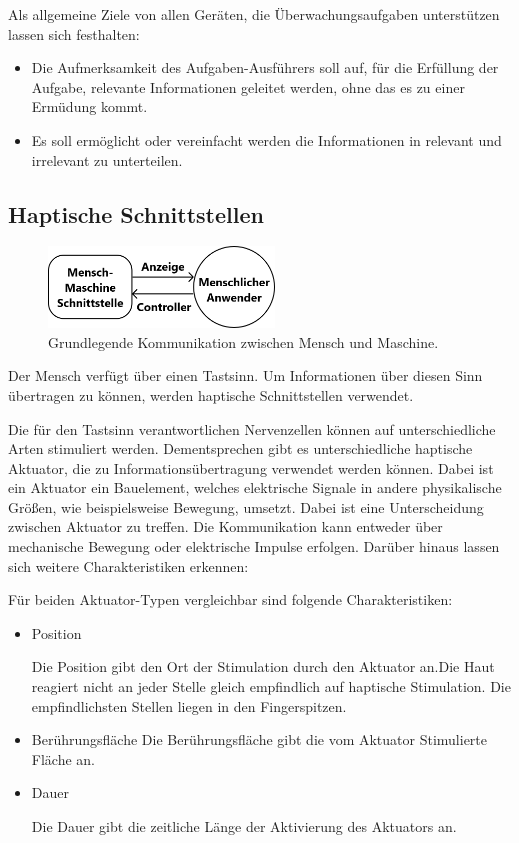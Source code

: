 \documentclass{llncs}					%
\begin{document}
Als allgemeine Ziele von allen Geräten, die Überwachungsaufgaben unterstützen lassen sich festhalten:
\begin{itemize}
	\item Die Aufmerksamkeit  des Aufgaben-Ausführers soll auf, für die Erfüllung der Aufgabe, relevante Informationen geleitet werden, ohne das es zu einer Ermüdung kommt.
	\item Es soll ermöglicht oder vereinfacht werden die Informationen in relevant und irrelevant zu unterteilen.
\end{itemize}

\subsection{Haptische Schnittstellen}

\begin{figure}[htbp]
	\begin{center}
		\includegraphics[width = 6cm]{Grafiken/14-Mensch-Maschine.png}
		\caption{Grundlegende Kommunikation zwischen Mensch und Maschine.\cite{Tan:2005:TDS:1198555.1198611}}
		\label{14-Mensch-Maschine}
	\end{center}
\end{figure}

Der Mensch verfügt über einen Tastsinn. Um Informationen über diesen Sinn übertragen zu können, werden haptische Schnittstellen verwendet. 

 
Die für den Tastsinn verantwortlichen Nervenzellen können auf unterschiedliche Arten stimuliert werden. Dementsprechen gibt es unterschiedliche haptische Aktuator, die zu Informationsübertragung verwendet werden können. Dabei ist ein Aktuator ein Bauelement, welches elektrische Signale in andere physikalische Größen, wie beispielsweise Bewegung, umsetzt. Dabei ist eine Unterscheidung zwischen Aktuator zu treffen. Die Kommunikation kann entweder über mechanische Bewegung oder elektrische Impulse erfolgen. Darüber hinaus lassen sich weitere Charakteristiken erkennen:

Für beiden Aktuator-Typen vergleichbar sind folgende Charakteristiken:
\begin{itemize}
	\item Position
	
	Die Position gibt den Ort der Stimulation durch den Aktuator an.Die Haut reagiert nicht an jeder Stelle gleich empfindlich auf haptische Stimulation\cite[S.~91]{doi:10.1518/001872008X250638}.
	Die empfindlichsten Stellen liegen in den Fingerspitzen.
	
	\item Berührungsfläche
	Die Berührungsfläche gibt die vom Aktuator Stimulierte Fläche an.
	
	\item Dauer
	
	Die Dauer gibt die zeitliche Länge der Aktivierung des Aktuators an.
\end{itemize}
\end{document}

